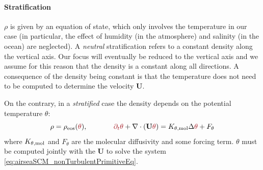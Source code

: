 \paragraph{Stratification}
$\rho$ is given by an equation of state, which only involves
the temperature in our case (in particular, the effect
of humidity (in the atmosphere) and salinity (in the ocean)
are neglected).
A \textit{neutral} stratification refers to a constant 
density along the vertical axis. Our focus will eventually
be reduced to the vertical axis and we assume for this
reason that the density is a constant along all directions.
A consequence of the density being constant is that
the temperature does not need to be computed
to determine the velocity $\mathbf{U}$.
\par
On the contrary, in a \textit{stratified} case the
density depends on the potential temperature $\theta$:
\begin{equation}
	\rho = \rho_{\rm eos}(\emphase{\theta}), ~~~~~~~~~~~
	\emphase{\partial_t \theta} +
	\nabla \cdot (\mathbf{U} \emphase{\theta}) =
	K_{\theta, {\rm mol}} \Delta \emphase{\theta} + F_\theta
\end{equation}
where $K_{\theta, {\rm mol}}$ and $F_\theta$ are
the molecular diffusivity and some forcing term.
$\theta$ must be computed jointly with the $\mathbf{U}$
to solve the system \eqref{eq:airseaSCM_nonTurbulentPrimitiveEq}.

